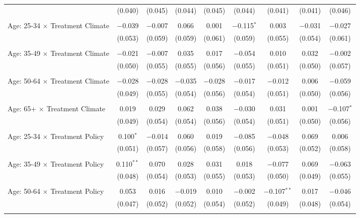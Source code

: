 \begin{tabular}{@{\extracolsep{5pt}}lcccccccc}
  & (0.040) & (0.045) & (0.044) & (0.045) & (0.044) & (0.041) & (0.041) & (0.046) \\ 
  & & & & & & & & \\ 
 Age: 25-34 $\times$ Treatment Climate & $-$0.039 & $-$0.007 & 0.066 & 0.001 & $-$0.115$^{*}$ & 0.003 & $-$0.031 & $-$0.027 \\ 
  & (0.053) & (0.059) & (0.059) & (0.061) & (0.059) & (0.055) & (0.054) & (0.061) \\ 
  & & & & & & & & \\ 
 Age: 35-49 $\times$ Treatment Climate & $-$0.021 & $-$0.007 & 0.035 & 0.017 & $-$0.054 & 0.010 & 0.032 & $-$0.002 \\ 
  & (0.050) & (0.055) & (0.055) & (0.056) & (0.055) & (0.051) & (0.050) & (0.057) \\ 
  & & & & & & & & \\ 
 Age: 50-64 $\times$ Treatment Climate & $-$0.028 & $-$0.028 & $-$0.035 & $-$0.028 & $-$0.017 & $-$0.012 & 0.006 & $-$0.059 \\ 
  & (0.049) & (0.055) & (0.054) & (0.056) & (0.054) & (0.051) & (0.050) & (0.056) \\ 
  & & & & & & & & \\ 
 Age: 65+ $\times$ Treatment Climate & 0.019 & 0.029 & 0.062 & 0.038 & $-$0.030 & 0.031 & 0.001 & $-$0.107$^{*}$ \\ 
  & (0.049) & (0.054) & (0.054) & (0.056) & (0.054) & (0.051) & (0.050) & (0.056) \\ 
  & & & & & & & & \\ 
 Age: 25-34 $\times$ Treatment Policy & 0.100$^{*}$ & $-$0.014 & 0.060 & 0.019 & $-$0.085 & $-$0.048 & 0.069 & 0.006 \\ 
  & (0.051) & (0.057) & (0.056) & (0.058) & (0.056) & (0.053) & (0.052) & (0.058) \\ 
  & & & & & & & & \\ 
 Age: 35-49 $\times$ Treatment Policy & 0.110$^{**}$ & 0.070 & 0.028 & 0.031 & 0.018 & $-$0.077 & 0.069 & $-$0.063 \\ 
  & (0.048) & (0.054) & (0.053) & (0.055) & (0.053) & (0.050) & (0.049) & (0.055) \\ 
  & & & & & & & & \\ 
 Age: 50-64 $\times$ Treatment Policy & 0.053 & 0.016 & $-$0.019 & 0.010 & $-$0.002 & $-$0.107$^{**}$ & 0.017 & $-$0.046 \\ 
  & (0.047) & (0.052) & (0.052) & (0.054) & (0.052) & (0.049) & (0.048) & (0.054) \\ 
  & & & & & & & & \\ 

\end{tabular}
